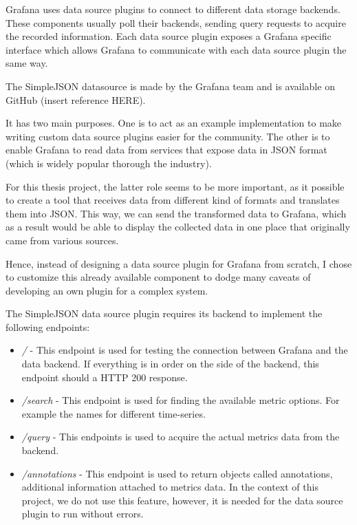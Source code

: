 Grafana uses data source plugins to connect to different data storage backends. These components usually poll their backends, sending query requests to acquire the recorded information. Each data source plugin exposes a Grafana specific interface which allows Grafana to communicate with each data source plugin the same way.

The SimpleJSON datasource is made by the Grafana team and is available on GitHub (insert reference HERE).

It has two main purposes. One is to act as an example implementation to make writing custom data source plugins easier for the community. The other is to enable Grafana to read data from services that expose data in JSON format (which is widely popular thorough the industry).

For this thesis project, the latter role seems to be more important, as it possible to create a tool that receives data from different kind of formats and translates them into JSON. This way, we can send the transformed data to Grafana, which as a result would be able to display the collected data in one place that originally came from various sources.

Hence, instead of designing a data source plugin for Grafana from scratch, I chose to customize this already available component to dodge many caveats of developing an own plugin for a complex system.

The SimpleJSON data source plugin requires its backend to implement the following endpoints:

\begin{itemize}
	\item \emph{/} - This endpoint is used for testing the connection between Grafana and the data backend. If everything is in order on the side of the backend, this endpoint should a HTTP 200 response.
	\item \emph{/search} - This endpoint is used for finding the available metric options. For example the names for different time-series.
	\item \emph{/query} - This endpoints is used to acquire the actual metrics data from the backend.
	\item \emph{/annotations} - This endpoint is used to return objects called annotations, additional information attached to metrics data. In the context of this project, we do not use this feature, however, it is needed for the data source plugin to run without errors.
\end{itemize}

